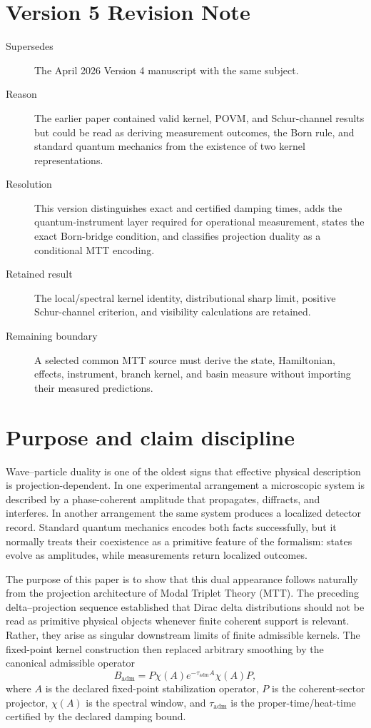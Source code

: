 \documentclass[11pt]{article}
\newcommand{\Badm}{B_{\mathrm{adm}}}
\newcommand{\ta}{\tau_{\mathrm{adm}}}
\begin{document}
\section*{Version 5 Revision Note}
\begin{description}
\item[Supersedes] The April 2026 Version 4 manuscript with the same subject.
\item[Reason] The earlier paper contained valid kernel, POVM, and Schur-channel results but
could be read as deriving measurement outcomes, the Born rule, and standard quantum
mechanics from the existence of two kernel representations.
\item[Resolution] This version distinguishes exact and certified damping times, adds the
quantum-instrument layer required for operational measurement, states the exact
Born-bridge condition, and classifies projection duality as a conditional MTT encoding.
\item[Retained result] The local/spectral kernel identity, distributional sharp limit,
positive Schur-channel criterion, and visibility calculations are retained.
\item[Remaining boundary] A selected common MTT source must derive the state, Hamiltonian,
effects, instrument, branch kernel, and basin measure without importing their measured
predictions.
\end{description}

\tableofcontents

\section{Purpose and claim discipline}
\label{sec:purpose}

Wave--particle duality is one of the oldest signs that effective physical description is
projection-dependent. In one experimental arrangement a microscopic system is described by
a phase-coherent amplitude that propagates, diffracts, and interferes. In another arrangement
the same system produces a localized detector record. Standard quantum mechanics encodes
both facts successfully, but it normally treats their coexistence as a primitive feature of the
formalism: states evolve as amplitudes, while measurements return localized outcomes.

The purpose of this paper is to show that this dual appearance follows naturally from the
projection architecture of Modal Triplet Theory (MTT). The preceding delta--projection
sequence established that Dirac delta distributions should not be read as primitive physical
objects whenever finite coherent support is relevant. Rather, they arise as singular downstream
limits of finite admissible kernels. The fixed-point kernel construction then replaced arbitrary
smoothing by the canonical admissible operator
\begin{equation}
  \Badm
  =
  P\chi(A)e^{-\ta A}\chi(A)P,
  \label{eq:purpose-badm}
\end{equation}
where \(A\) is the declared fixed-point stabilization operator, \(P\) is the coherent-sector
projector, \(\chi(A)\) is the spectral window, and \(\ta\) is the proper-time/heat-time
certified by the declared damping bound.
\end{document}
